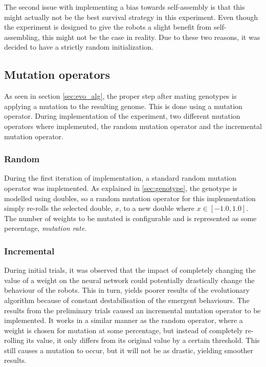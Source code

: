 The second issue with implementing a bias towards self-assembly is that this might actually not be the best survival strategy in this experiment.
Even though the experiment is designed to give the robots a slight benefit from self-assembling, this might not be the case in reality.
Due to these two reasons, it was decided to have a strictly random initialization.

\subsection{Mutation operators}
As seen in section \ref{sec:evo_alg}, the proper step after mating genotypes is applying a mutation to the resulting genome.
This is done using a mutation operator.
During implementation of the experiment, two different mutation operators where implemented, the random mutation operator and the incremental mutation operator.

\subsubsection{Random}
During the first iteration of implementation, a standard random mutation operator was implemented.
As explained in \ref{sec:genotype}, the genotype is modelled using doubles, so a random mutation operator for this implementation simply re-rolls the selected double, $x$, to a new double where $x \in [-1.0, 1.0]$. 
The number of weights to be mutated is configurable and is represented as some percentage, \emph{mutation rate}.

\subsubsection{Incremental}
During initial trials, it was observed that the impact of completely changing the value of a weight on the neural network could potentially drastically change the behaviour of the robots.
This in turn, yields poorer results of the evolutionary algorithm because of constant destabilisation of the emergent behaviours.
The results from the preliminary trials caused an incremental mutation operator to be implemented.
It works in a similar manner as the random operator, where a weight is chosen for mutation at some percentage, but instead of completely re-rolling its value, it only differs from its original value by a certain threshold.
This still causes a mutation to occur, but it will not be as drastic, yielding smoother results. 

